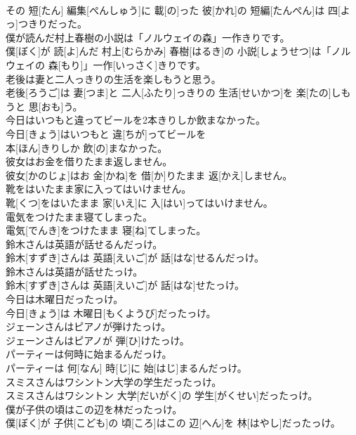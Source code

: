\documentclass[8pt]{extreport}
\begin{document}
\begin{CJK}{UTF8}{min}
\\	その 短[たん] 編集[ぺんしゅう]に 載[の]った 彼[かれ]の 短編[たんぺん]は 四[よっ]つきりだった。
\\	僕が読んだ村上春樹の小説は「ノルウェイの森」一作きりです。	
\\	僕[ぼく]が 読[よ]んだ 村上[むらかみ] 春樹[はるき]の 小説[しょうせつ]は「ノルウェイの 森[もり]」一作[いっさく]きりです。
\\	老後は妻と二人っきりの生活を楽しもうと思う。	
\\	老後[ろうご]は 妻[つま]と 二人[ふたり]っきりの 生活[せいかつ]を 楽[たの]しもうと 思[おも]う。
\\	今日はいつもと違ってビールを2本きりしか飲まなかった。	
\\	今日[きょう]はいつもと 違[ちが]ってビールを 
\\	本[ほん]きりしか 飲[の]まなかった。
\\	彼女はお金を借りたまま返しません。	
\\	彼女[かのじょ]はお 金[かね]を 借[か]りたまま 返[かえ]しません。
\\	靴をはいたまま家に入ってはいけません。	
\\	靴[くつ]をはいたまま 家[いえ]に 入[はい]ってはいけません。
\\	電気をつけたまま寝てしまった。	
\\	電気[でんき]をつけたまま 寝[ね]てしまった。
\\	鈴木さんは英語が話せるんだっけ。	
\\	鈴木[すずき]さんは 英語[えいご]が 話[はな]せるんだっけ。
\\	鈴木さんは英語が話せたっけ。	
\\	鈴木[すずき]さんは 英語[えいご]が 話[はな]せたっけ。
\\	今日は木曜日だったっけ。	
\\	今日[きょう]は 木曜日[もくようび]だったっけ。
\\	ジェーンさんはピアノが弾けたっけ。	
\\	ジェーンさんはピアノが 弾[ひ]けたっけ。
\\	パーティーは何時に始まるんだっけ。	
\\	パーティーは 何[なん] 時[じ]に 始[はじ]まるんだっけ。
\\	スミスさんはワシントン大学の学生だったっけ。	
\\	スミスさんはワシントン 大学[だいがく]の 学生[がくせい]だったっけ。
\\	僕が子供の頃はこの辺を林だったっけ。	
\\	僕[ぼく]が 子供[こども]の 頃[ころ]はこの 辺[へん]を 林[はやし]だったっけ。

\end{CJK}
\end{document}
